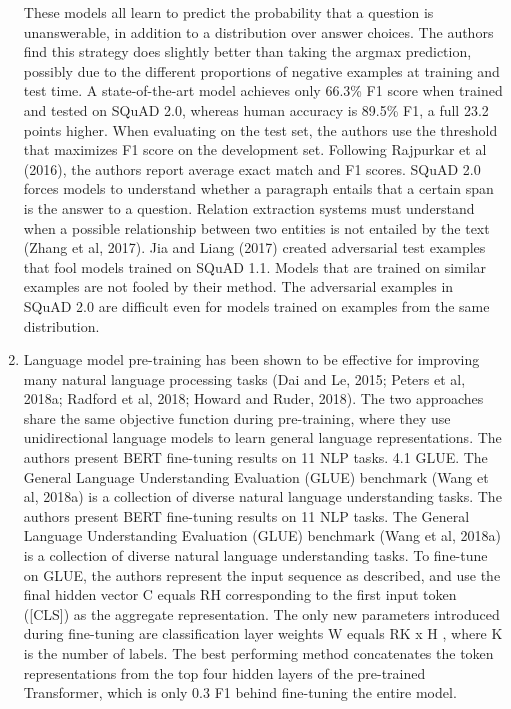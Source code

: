 \documentclass[11pt]{article}
\begin{document}
\begin{enumerate}
    These models all learn to predict the probability that a question is unanswerable, in addition to a distribution over answer choices.
    The authors find this strategy does slightly better than taking the argmax prediction, possibly due to the different proportions of negative examples at training and test time. A state-of-the-art model achieves only 66.3\% F1 score when trained and tested on SQuAD 2.0, whereas human accuracy is 89.5\% F1, a full 23.2 points higher.
    When evaluating on the test set, the authors use the threshold that maximizes F1 score on the development set.
    Following Rajpurkar et al (2016), the authors report average exact match and F1 scores.  SQuAD 2.0 forces models to understand whether a paragraph entails that a certain span is the answer to a question.
    Relation extraction systems must understand when a possible relationship between two entities is not entailed by the text (Zhang et al, 2017).
    Jia and Liang (2017) created adversarial test examples that fool models trained on SQuAD 1.1. Models that are trained on similar examples are not fooled by their method.
    The adversarial examples in SQuAD 2.0 are difficult even for models trained on examples from the same distribution. \cite{dataset}
    \item Language model pre-training has been shown to be effective for improving many natural language processing tasks (Dai and Le, 2015; Peters et al, 2018a; Radford et al, 2018; Howard and Ruder, 2018).
    The two approaches share the same objective function during pre-training, where they use unidirectional language models to learn general language representations. The authors present BERT fine-tuning results on 11 NLP tasks. 4.1 GLUE. The General Language Understanding Evaluation (GLUE) benchmark (Wang et al, 2018a) is a collection of diverse natural language understanding tasks.
    The authors present BERT fine-tuning results on 11 NLP tasks.
    The General Language Understanding Evaluation (GLUE) benchmark (Wang et al, 2018a) is a collection of diverse natural language understanding tasks.
    To fine-tune on GLUE, the authors represent the input sequence as described, and use the final hidden vector C equals RH corresponding to the first input token ([CLS]) as the aggregate representation.
    The only new parameters introduced during fine-tuning are classification layer weights W equals RK x H , where K is the number of labels. The best performing method concatenates the token representations from the top four hidden layers of the pre-trained Transformer, which is only 0.3 F1 behind fine-tuning the entire model.

\end{enumerate}
\end{document}
